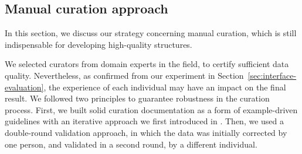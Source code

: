 




\subsection{Manual curation approach}
\label{sec:data-correction}
\label{subsec:manual_correction}

In this section, we discuss our strategy concerning manual curation, which is still indispensable for developing high-quality structures. 

We selected curators from domain experts in the field, to certify sufficient data quality. 
Nevertheless, as confirmed from our experiment in Section~\ref{sec:interface-evaluation}, the experience of each individual may have an impact on the final result.
We followed two principles to guarantee robustness in the curation process. 
First, we built solid curation documentation as a form of example-driven guidelines with an iterative approach we first introduced in \cite{foppiano2021supermat}. 
Then, we used a double-round validation approach, in which the data was initially corrected by one person, and validated in a second round, by a different individual. 

